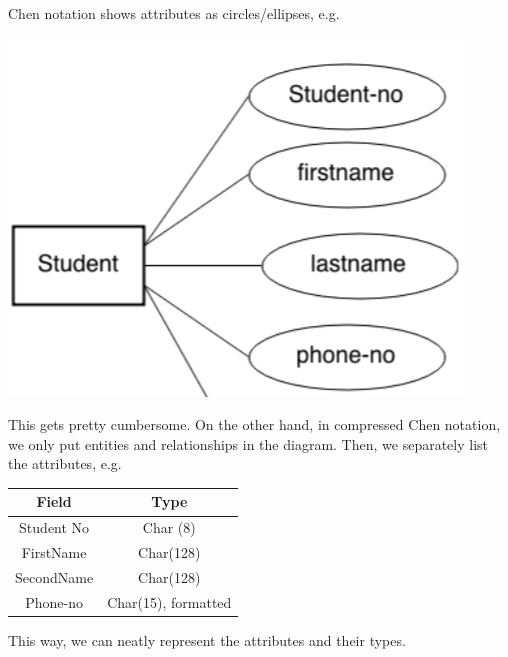 \documentclass[a4paper, openany]{memoir}
\begin{document}
\noindent Chen notation shows attributes as circles/ellipses, e.g.
\begin{center}
    \includegraphics[scale=0.8]{src/L10I3.PNG}
\end{center}
This gets pretty cumbersome. On the other hand, in compressed Chen notation, we only put entities and relationships in the diagram. Then, we separately list the attributes, e.g.
\begin{center}
    \begin{tabular}{|c|c|}
        \hline
        Field & Type \\
        \hline
        Student No & Char (8) \\
        \hline
        FirstName & Char(128) \\
        \hline
        SecondName & Char(128) \\
        \hline
        Phone-no & Char(15), formatted \\
        \hline
    \end{tabular}
\end{center}
This way, we can neatly represent the attributes and their types.
\end{document}
